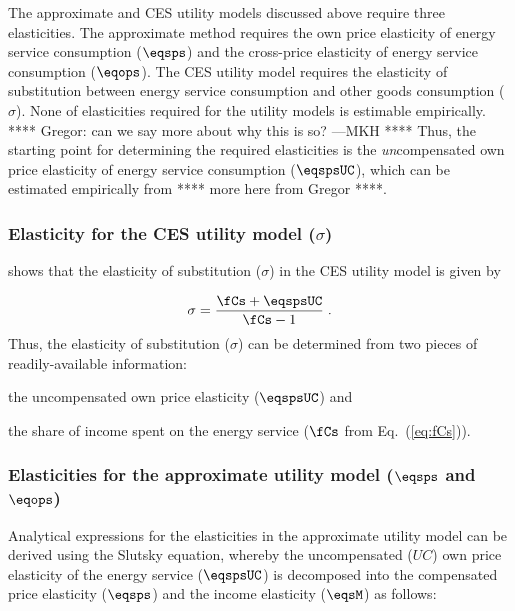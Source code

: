 The approximate and CES utility models discussed above
require three elasticities.
The approximate method requires 
the own price elasticity of energy service consumption ($\eqsps$) and
the cross-price elasticity of energy service consumption ($\eqops$).
The CES utility model requires the elasticity of substitution
between energy service consumption and other goods consumption ($\sigma$).
None of elasticities required for the utility models
is estimable empirically.
**** Gregor: can we say more about why this is so? ---MKH ****
Thus, the starting point for determining the required elasticities 
is the \emph{un}compensated own price elasticity 
of energy service consumption ($\eqspsUC$), 
which can be estimated empirically from
**** more here from Gregor ****. 


\subsubsection{Elasticity for the CES utility model ($\sigma$)} 
\label{sec:elasticity_ces}

\citet{Gortz1977} shows that
the elasticity of substitution ($\sigma$)
in the CES utility model is given by

\begin{equation} \label{eq:sigma}
  \sigma = \frac{\fCs + \eqspsUC}{\fCs - 1} \; .
\end{equation}
%
Thus, the elasticity of substitution ($\sigma$) 
can be determined from two pieces of readily-available information:
%
\begin{enumerate*}[label={(\alph*)}]
	
  \item the uncompensated own price elasticity ($\eqspsUC$) and 
  
  \item the share of income spent on the energy service ($\fCs$ 
        from Eq.~(\ref{eq:fCs})).

\end{enumerate*}


\subsubsection{Elasticities for the approximate utility model ($\eqsps$ and $\eqops$)} 
\label{sec:elasticities_approx}

Analytical expressions for the elasticities in the approximate utility model
can be derived using the Slutsky equation, 
whereby the uncompensated ($UC$) own price elasticity 
of the energy service ($\eqspsUC$) 
is decomposed into the compensated price elasticity ($\eqsps$) and
the income elasticity ($\eqsM$) as follows:

